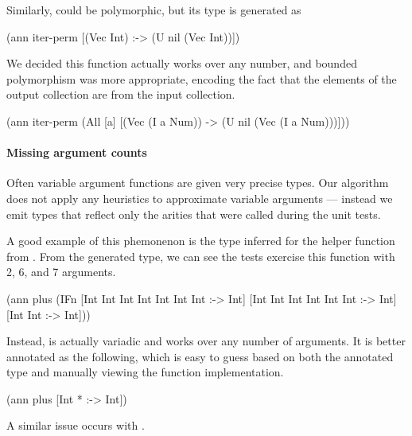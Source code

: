 Similarly,  could be polymorphic, 
but its type is generated as

\begin{cljlisting}
(ann iter-perm [(Vec Int) :-> (U nil (Vec Int))])
\end{cljlisting}

We decided this function actually works over any number,
and bounded polymorphism was more appropriate, encoding
the fact that the elements of the output collection
are from the input collection.

\begin{cljlisting}
(ann iter-perm
  (All [a]
    [(Vec (I a Num)) -> (U nil (Vec (I a Num)))]))
\end{cljlisting}
%

\paragraph{Missing argument counts}
Often variable argument functions are given very precise types.
Our algorithm does not apply any heuristics to approximate
variable arguments --- instead we emit types that reflect
only the arities that were called during the unit tests.

A good example of this phemonenon is the type inferred
for the  helper function from .
From the generated type, we can see the tests exercise this function with 2, 6,
and 7 arguments.

\begin{cljlisting}
(ann plus
  (IFn [Int Int Int Int Int Int Int :-> Int]
       [Int Int Int Int Int Int :-> Int]
       [Int Int :-> Int]))
\end{cljlisting}

Instead,  is actually variadic and works over any number of arguments.
It is better annotated as the following, which is easy to guess based on
both the annotated type and manually viewing the function implementation.

\begin{cljlisting}
(ann plus [Int * :-> Int])
\end{cljlisting}

A similar issue occurs with .

